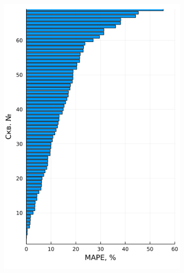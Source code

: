 \documentclass[14pt]{article}
\begin{document}
\begin{figure}[!htb]
	\begin{subfigure}[b]{0.45\linewidth}
		\includegraphics[width=\linewidth]{pic/tor_gar_ppl}
		\caption{}
		\label{fig:gar_tor_ppl_a}
	\end{subfigure}
	\begin{subfigure}[b]{0.45\linewidth}

\end{subfigure}
\end{figure}
\end{document}

